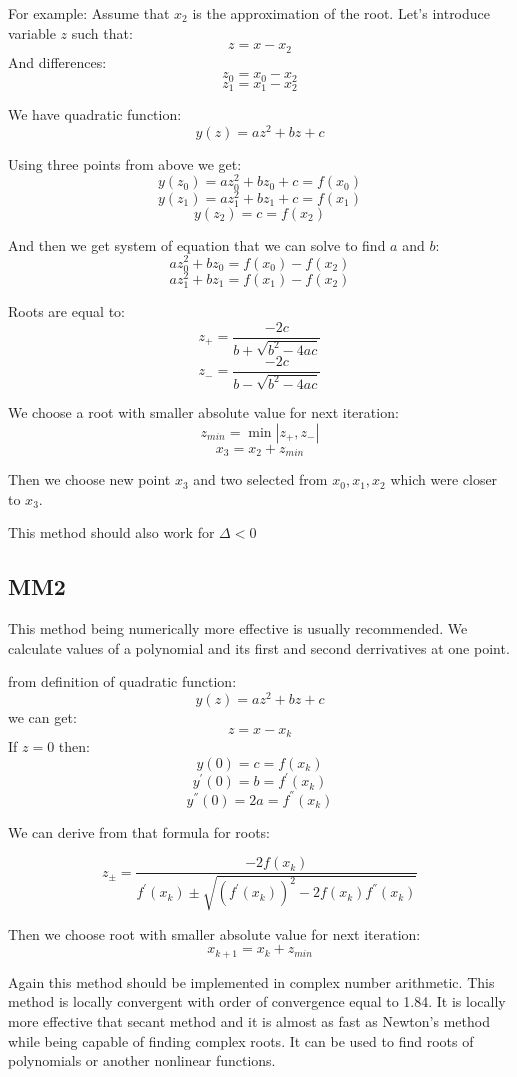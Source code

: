 \documentclass[12pt]{report}
\begin{document}
For example:
Assume that $x_2$ is the approximation of the root.
Let's introduce variable $z$ such that:
\[ z = x - x_2 \]
And differences:
\[ z_0 = x_0 - x_2 \]
\[ z_1 = x_1 - x_2 \]

We have quadratic function:
\[ y(z) = az^2 + bz + c \]

Using three points from above we get:
\[ y(z_0) = az_0^2 + bz_0 + c = f(x_0) \]
\[ y(z_1) = az_1^2 + bz_1 + c = f(x_1) \]
\[ y(z_2) = c = f(x_2) \]

And then we get system of equation that we can solve to find $a$ and $b$:
\[ az_0^2 + bz_0 = f(x_0) - f(x_2) \]
\[ az_1^2 + bz_1 = f(x_1) - f(x_2) \]

Roots are equal to:
\[ z_+ = \frac{-2c}{b+\sqrt{b^2 - 4ac}} \]
\[ z_- = \frac{-2c}{b-\sqrt{b^2 - 4ac}} \]

We choose a root with smaller absolute value for next iteration:
\[ z_{min} = \min{|z_+, z_-|} \]
\[ x_3 = x_2 + z_{min} \]

Then we choose new point $x_3$ and two selected from $x_0, x_1, x_2$ which were closer to $x_3$.

This method should also work for $\Delta < 0 $


\subsection{MM2}
This method being numerically more effective is usually recommended.
We calculate values of a polynomial and its first and second derrivatives at one point.

from definition of quadratic function:
\[ y(z) = az^2 + bz + c \]
we can get:
\[ z = x - x_k \]
If $z = 0$ then:
\[ y(0) = c = f(x_k) \]
\[ y^{'}(0) = b = f^{'}(x_k) \]
\[ y^{''}(0) = 2a = f^{''}(x_k) \]

We can derive from that formula for roots:

\[ z_{\pm} = \frac{-2f(x_k)}{f^{'}(x_k) \pm \sqrt{ (f^{'}(x_k))^2 - 2f(x_k)f^{''}(x_k)}}\]

Then we choose root with smaller absolute value for next iteration:
\[ x_{k+1} = x_k + z_{min} \]

Again this method should be implemented in complex number arithmetic.
This method is locally convergent with order of convergence equal to 1.84. It is locally more effective that secant method and it is almost as fast as Newton's method while being capable of finding complex roots. It can be used to find roots of polynomials or another nonlinear functions.
\end{document}
